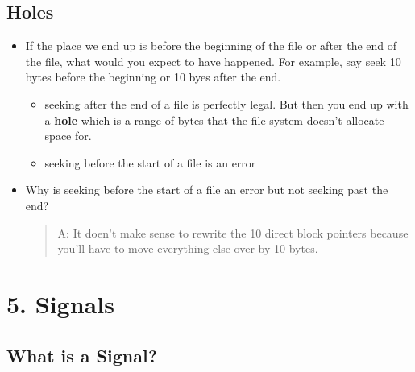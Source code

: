 \documentclass[]{article}
\begin{document}
\subsection{\texorpdfstring{\textbf{Holes}}{Holes}}\label{header-n450}

\begin{itemize}
\item
  If the place we end up is before the beginning of the file or after
  the end of the file, what would you expect to have happened. For
  example, say seek 10 bytes before the beginning or 10 byes after the
  end.

  \begin{itemize}
  \item
    seeking after the end of a file is perfectly legal. But then you end
    up with a \textbf{hole} which is a range of bytes that the file
    system doesn't allocate space for. 
  \item
    seeking before the start of a file is an error 
  \end{itemize}
\item
  Why is seeking before the start of a file an error but not seeking
  past the end?

  \begin{quote}
  A: It doen't make sense to rewrite the 10 direct block pointers
  because you'll have to move everything else over by 10 bytes.
  \end{quote}
\end{itemize}

\section{\texorpdfstring{\textbf{5.
Signals}}{5. Signals}}\label{header-n464}

\subsection{\texorpdfstring{\textbf{What is a
Signal?}}{What is a Signal?}}\label{header-n465}
\end{document}
